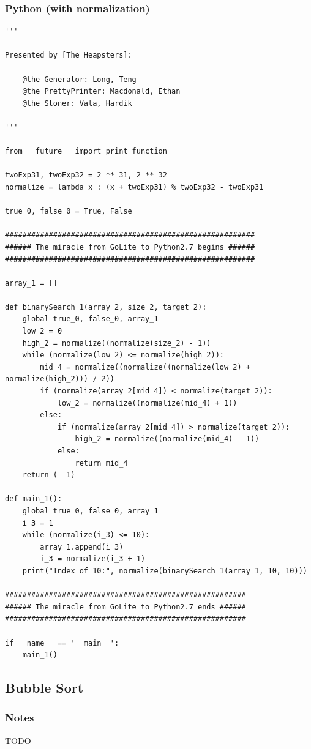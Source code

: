 \documentclass{article}
\begin{document}
\subsubsection{Python (with normalization)}
\begin{lstlisting}
'''

Presented by [The Heapsters]:

	@the Generator: Long, Teng
	@the PrettyPrinter: Macdonald, Ethan
	@the Stoner: Vala, Hardik

'''

from __future__ import print_function

twoExp31, twoExp32 = 2 ** 31, 2 ** 32
normalize = lambda x : (x + twoExp31) % twoExp32 - twoExp31

true_0, false_0 = True, False

#########################################################
###### The miracle from GoLite to Python2.7 begins ######
#########################################################

array_1 = []

def binarySearch_1(array_2, size_2, target_2):
	global true_0, false_0, array_1
	low_2 = 0
	high_2 = normalize((normalize(size_2) - 1))
	while (normalize(low_2) <= normalize(high_2)):
		mid_4 = normalize((normalize((normalize(low_2) + normalize(high_2))) / 2))
		if (normalize(array_2[mid_4]) < normalize(target_2)):
			low_2 = normalize((normalize(mid_4) + 1))
		else:
			if (normalize(array_2[mid_4]) > normalize(target_2)):
				high_2 = normalize((normalize(mid_4) - 1))
			else:
				return mid_4
	return (- 1)

def main_1():
	global true_0, false_0, array_1
	i_3 = 1
	while (normalize(i_3) <= 10):
		array_1.append(i_3)
		i_3 = normalize(i_3 + 1)
	print("Index of 10:", normalize(binarySearch_1(array_1, 10, 10)))

#######################################################
###### The miracle from GoLite to Python2.7 ends ######
#######################################################

if __name__ == '__main__':
	main_1()
\end{lstlisting}

\subsection{Bubble Sort}
\subsubsection{Notes}
TODO 
\end{document}
